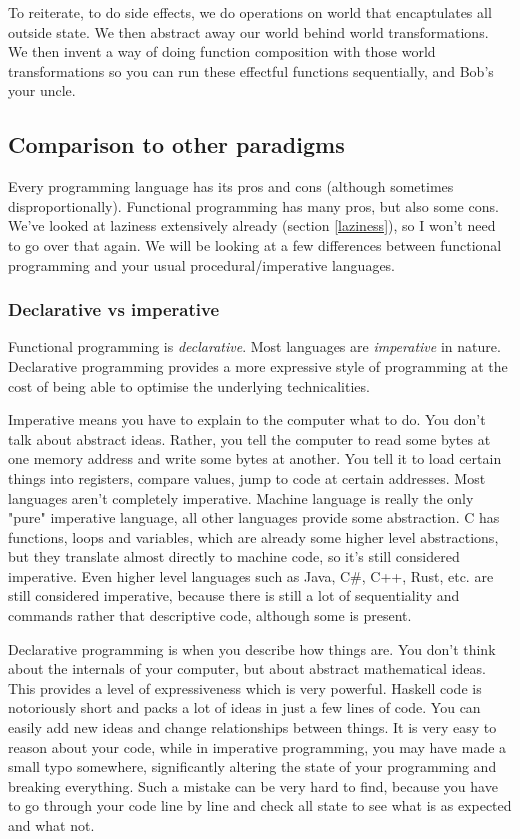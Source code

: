 \documentclass[11pt]{article}
\begin{document}
To reiterate, to do side effects, we do operations on world that encaptulates
all outside state. We then abstract away our world behind world
transformations. We then invent a way of doing function composition with those
world transformations so you can run these effectful functions sequentially,
and Bob's your uncle.

\subsection{Comparison to other paradigms}\label{comparison}

Every programming language has its pros and cons (although sometimes
disproportionally). Functional programming has many pros, but also some cons.
We've looked at laziness extensively already (section \ref{laziness}), so I
won't need to go over that again. We will be looking at a few differences
between functional programming and your usual procedural/imperative languages.

\subsubsection{Declarative vs imperative}

Functional programming is \emph{declarative}. Most languages are
\emph{imperative} in nature. Declarative programming provides a more expressive
style of programming at the cost of being able to optimise the underlying
technicalities.

Imperative means you have to explain to the computer what to do. You don't talk
about abstract ideas. Rather, you tell the computer to read some bytes at one
memory address and write some bytes at another. You tell it to load certain
things into registers, compare values, jump to code at certain addresses. Most
languages aren't completely imperative. Machine language is really the only
"pure" imperative language, all other languages provide some abstraction. C has
functions, loops and variables, which are already some higher level
abstractions, but they translate almost directly to machine code, so it's still
considered imperative. Even higher level languages such as Java, C\#, C++,
Rust, etc. are still considered imperative, because there is still a lot of
sequentiality and commands rather that descriptive code, although some is
present.

Declarative programming is when you describe how things are. You don't think
about the internals of your computer, but about abstract mathematical ideas.
This provides a level of expressiveness which is very powerful. Haskell code is
notoriously short and packs a lot of ideas in just a few lines of code. You can
easily add new ideas and change relationships between things. It is very easy
to reason about your code, while in imperative programming, you may have made a
small typo somewhere, significantly altering the state of your programming and
breaking everything. Such a mistake can be very hard to find, because you have
to go through your code line by line and check all state to see what is as
expected and what not.
\end{document}
